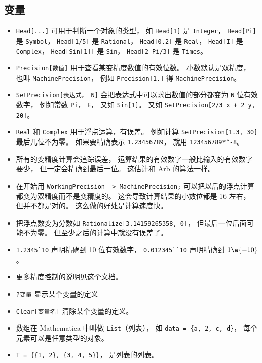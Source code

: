 \subsection{变量}
\begin{itemize}
\item \verb|Head[...]| 可用于判断一个对象的类型， 如 \verb|Head[1]| 是 \verb|Integer|， \verb|Head[Pi]| 是 \verb|Symbol|， \verb|Head[1/5]| 是 \verb|Rational|， \verb|Head[0.2]| 是 \verb|Real|， \verb|Head[I]| 是 \verb|Complex|， \verb|Head[Sin[1]]|  是 \verb|Sin|， \verb|Head[2 Pi/3]| 是 \verb|Times|。
\item \verb|Precision[数值]| 用于查看某变精度数值的有效位数。 小数默认是双精度， 也叫 \verb|MachinePrecision|， 例如 \verb|Precision[1.]| 得 \verb|MachinePrecision|。
\item \verb|SetPrecision[表达式， N]| 会把表达式中可以求出数值的部分都变为 \verb|N| 位有效数字， 例如常数 \verb|Pi|， \verb|E|， 又如 \verb|Sin[1]|。 又如 \verb|SetPrecision[2/3 x + 2 y, 20]|。
\item \verb|Real| 和 \verb|Complex| 用于浮点运算，有误差。 例如计算 \verb|SetPrecision[1.3, 30]| 最后几位不为零。 如果要精确表示 \verb|1.23456789|， 就用 \verb|123456789*^-8|。
\item 所有的变精度计算会追踪误差， 运算结果的有效数字一般比输入的有效数字要少， 但一定会精确到最后一位。 这估计和 Arb 的算法一样。
\item 在开始用 \verb|WorkingPrecision -> MachinePrecision;| 可以把以后的浮点计算都变为双精度而不是变精度的。 这会导致计算结果的小数位都是 16 左右， 但并不都是对的。 这么做的好处是计算速度快。
\item 把浮点数变为分数如 \verb|Rationalize[3.14159265358, 0]|， 但最后一位后面可能不为零。 但至少之后的计算中就没有误差了。
\item \verb|1.2345`10| 声明精确到 10 位有效数字， \verb|0.012345``10| 声明精确到 $1\e{-10}$。
\item 更多精度控制的说明见\href{https://reference.wolfram.com/language/howto/ControlThePrecisionAndAccuracyOfNumericalResults.html}{这个文档}。
\item \verb|?变量| 显示某个变量的定义
\item \verb|Clear[变量名]| 清除某个变量的定义。
\item 数组在 Mathematica 中叫做 \verb|List|（列表）， 如 \verb|data = {a, 2, c, d}|， 每个元素可以是任意类型的对象。
\item \verb|T = {{1, 2}, {3, 4, 5}}|， 是列表的列表。
\end{itemize}

